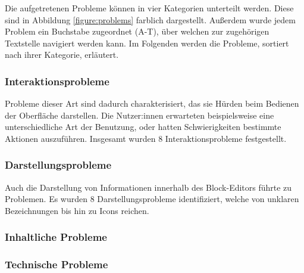 Die aufgetretenen Probleme können in vier Kategorien unterteilt werden. Diese sind in Abbildung \ref{figure:problems} farblich dargestellt. Außerdem wurde jedem Problem ein Buchstabe zugeordnet (A-T), über welchen zur zugehörigen Textstelle navigiert werden kann. Im Folgenden werden die Probleme, sortiert nach ihrer Kategorie, erläutert.

\subsubsection{Interaktionsprobleme}

Probleme dieser Art sind dadurch charakterisiert, das sie Hürden beim Bedienen der Oberfläche darstellen. Die Nutzer:innen erwarteten beispielsweise eine unterschiedliche Art der Benutzung, oder hatten Schwierigkeiten bestimmte Aktionen auszuführen. Insgesamt wurden 8 Interaktionsprobleme festgestellt.


\subsubsection{Darstellungsprobleme}

Auch die Darstellung von Informationen innerhalb des Block-Editors führte zu Problemen. Es wurden 8 Darstellungsprobleme identifiziert, welche von unklaren Bezeichnungen bis hin zu Icons reichen.


\subsubsection{Inhaltliche Probleme}


\subsubsection{Technische Probleme}

